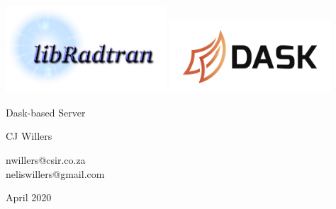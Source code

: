 
\thispagestyle{empty}

{
\sffamily
\centering
\large

~\vspace{\fill}

\vspace{2cm}
\includegraphics[width=0.45\textwidth]{pic/libradtran.png}
\includegraphics[width=0.45\textwidth]{pic/dask.png}

\vspace{3cm}
{\huge Dask-based \libradtran{} Server }

\vspace{1.5cm}

\vspace{1.5cm}
{\Large CJ Willers }

\vspace{2mm}
nwillers@csir.co.za\\
neliswillers@gmail.com


\vspace{\fill}

April 2020

}

\clearpage
\tableofcontents*

\clearpage
\listoffigures*

%

